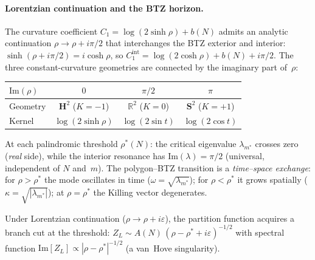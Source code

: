 \paragraph{Lorentzian continuation and the BTZ horizon.}
The curvature coefficient $C_1 = \log(2\sinh\rho) + b(N)$ admits
an analytic continuation $\rho \to \rho + i\pi/2$ that interchanges
the BTZ exterior and interior:
$\sinh(\rho + i\pi/2) = i\cosh\rho$, so
$C_1^{\mathrm{int}} = \log(2\cosh\rho) + b(N) + i\pi/2$.
The three constant-curvature geometries are connected by the imaginary
part of~$\rho$:
\begin{center}
\begin{tabular}{lccc}
\toprule
$\mathrm{Im}(\rho)$ & $0$ & $\pi/2$ & $\pi$ \\
\midrule
Geometry & $\mathbf{H}^2$ ($K{=}{-}1$) & $\mathbb{R}^2$ ($K{=}0$) &
  $\mathbf{S}^2$ ($K{=}{+}1$) \\
Kernel & $\log(2\sinh\rho)$ & $\log(2\sin t)$ & $\log(2\cos t)$ \\
\bottomrule
\end{tabular}
\end{center}
At each palindromic threshold $\rho^*(N)$: the critical eigenvalue
$\lambda_{m^*}$ crosses zero (\emph{real} side), while the interior
resonance has $\mathrm{Im}(\lambda) = \pi/2$ (universal, independent
of $N$ and~$m$).
The polygon--BTZ transition is a \emph{time--space exchange}:
for $\rho > \rho^*$ the mode oscillates in time
($\omega = \sqrt{\lambda_{m^*}}$); for $\rho < \rho^*$ it grows
spatially ($\kappa = \sqrt{|\lambda_{m^*}|}$);
at $\rho = \rho^*$ the Killing vector degenerates.

Under Lorentzian continuation ($\rho \to \rho + i\varepsilon$),
the partition function acquires a branch cut at the threshold:
$Z_L \sim A(N)\,({\rho - \rho^* + i\varepsilon})^{-1/2}$
with spectral function $\mathrm{Im}[Z_L] \propto |\rho - \rho^*|^{-1/2}$
(a van~Hove singularity).


